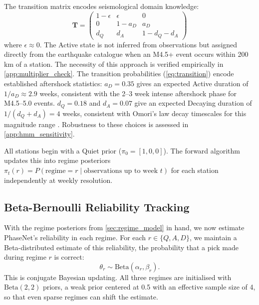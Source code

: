 The transition matrix encodes seismological domain knowledge:
\begin{equation}
    \mathbf{T} = \begin{pmatrix}
        1 - \epsilon & \epsilon & 0 \\
        0 & 1 - a_D & a_D \\
        d_Q & d_A & 1 - d_Q - d_A
    \end{pmatrix}
    \label{eq:transition}
\end{equation}
where $\epsilon \approx 0$. The Active state is not inferred from observations but assigned directly from the earthquake catalogue when an M4.5+ event occurs within 200\,km of a station. The necessity of this approach is verified empirically in \cref{app:multiplier_check}. The transition probabilities (\cref{eq:transition}) encode established aftershock statistics: $a_D = 0.35$ gives an expected Active duration of $1/a_D \approx 2.9$ weeks, consistent with the 2--3 week intense aftershock phase for M4.5--5.0 events. $d_Q = 0.18$ and $d_A = 0.07$ give an expected Decaying duration of $1/(d_Q + d_A) = 4$ weeks, consistent with Omori's law decay timescales for this magnitude range \citep{utsu1995centenary}. Robustness to these choices is assessed in \cref{app:hmm_sensitivity}.

\medskip
All stations begin with a Quiet prior ($\pi_0 = [1, 0, 0]$). The forward algorithm \citep{rabiner1989hmm} updates this into regime posteriors $\pi_t(r) = P(\text{regime} = r \mid \text{observations up to week } t)$ for each station independently at weekly resolution.

\subsection{Beta-Bernoulli Reliability Tracking}
\label{sec:beta_bernoulli}

With the regime posteriors from \cref{sec:regime_model} in hand, we now estimate PhaseNet's reliability in each regime. For each $r \in \{Q, A, D\}$, we maintain a Beta-distributed estimate of this reliability, the probability that a pick made during regime $r$ is correct:
\begin{equation}
    \theta_r \sim \text{Beta}(\alpha_r, \beta_r).
\end{equation}
This is conjugate Bayesian updating. All three regimes are initialised with $\text{Beta}(2, 2)$ priors, a weak prior centered at 0.5 with an effective sample size of 4, so that even sparse regimes can shift the estimate.


